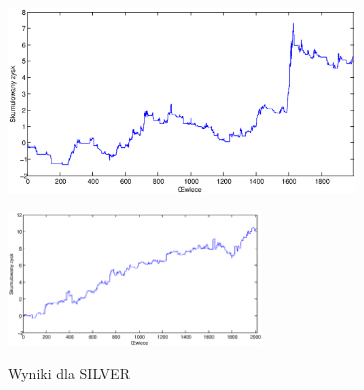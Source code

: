 \begin{figure}[h]
\begin{minipage}{.49\linewidth}
\centering
\includegraphics[width=0.82\textwidth]{images/S1d_silver.eps}
\label{mansard}
\end{minipage}
\begin{minipage}{\linewidth}
\centering
\includegraphics[width=0.6\textwidth]{images/S1s_silver.eps}
\label{mansard}
\end{minipage}
\caption{Wyniki dla SILVER}
\end{figure}
\FloatBarrier
